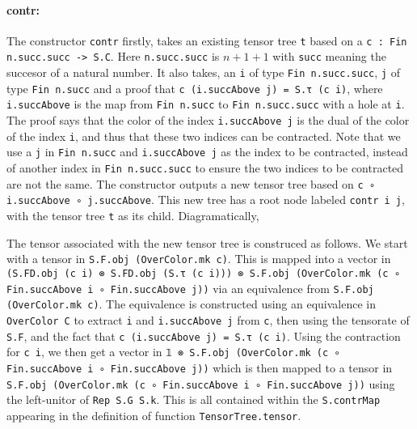 \documentclass[a4paper, 11pt]{article}
\newcommand{\tensorTree}[1]{
\begin{center}
  \fcolorbox{mycolor}{white}{%
#1}
\end{center}
}
\begin{document}
\paragraph{contr:}
The constructor \lstinline|contr| firstly, takes an existing tensor tree \lstinline|t| based on a 
\lstinline|c : Fin n.succ.succ -> S.C|. Here \lstinline|n.succ.succ| is $n + 1 + 1$ with \lstinline|succ| meaning 
the succesor of a natural number. 
It also takes,
an \lstinline|i| of type \lstinline|Fin n.succ.succ|, \lstinline|j| of type \lstinline|Fin n.succ|
and a proof that \lstinline|c (i.succAbove j) = S.τ (c i)|, where \lstinline|i.succAbove| is the map from \lstinline|Fin n.succ| to \lstinline|Fin n.succ.succ| with a hole at \lstinline|i|. 
The proof says that the color of the index \lstinline|i.succAbove j| is the dual of the color of the index \lstinline|i|, and thus that these 
two indices can be contracted.
Note that we use a \lstinline|j| in \lstinline|Fin n.succ| and \lstinline|i.succAbove j| as the index to be contracted, instead 
of another index in  \lstinline|Fin n.succ.succ| to ensure the two indices to be contracted are not the same. 
The constructor outputs a new tensor tree based on \lstinline|c ∘ i.succAbove ∘ j.succAbove|. 
This new tree has a root node labeled \lstinline|contr i j|, with the tensor tree \lstinline|t| as its child.
Diagramatically, 
\tensorTree{
  \begin{tikzpicture}
    \node[draw=black] (A) at (0,0) {\lstinline|contr i j|};
    \node (B) at (0,-1) {\lstinline|t|};
    \draw[->] (A) -- (B);
  \end{tikzpicture} 
}
The tensor associated with the new tensor tree is construced as follows. 
We start with a tensor in \lstinline|S.F.obj (OverColor.mk c)|.
This is mapped into a vector in \lstinline|(S.FD.obj (c i) ⊗ S.FD.obj (S.τ (c i))) ⊗ S.F.obj (OverColor.mk (c ∘ Fin.succAbove i ∘ Fin.succAbove j))| via an equivalence from 
\lstinline|S.F.obj (OverColor.mk c)|. The equivalence is constructed using an equivalence 
in \lstinline|OverColor C| to extract \lstinline|i| and \lstinline|i.succAbove j| from \lstinline|c|,
then using the tensorate of \lstinline|S.F|, and the fact that \lstinline|c (i.succAbove j) = S.τ (c i)|. 
Using the contraction for \lstinline|c i|, we then get a vector in 
\lstinline|𝟙 ⊗ S.F.obj (OverColor.mk (c ∘ Fin.succAbove i ∘ Fin.succAbove j))| which is then 
mapped to a tensor in \lstinline|S.F.obj (OverColor.mk (c ∘ Fin.succAbove i ∘ Fin.succAbove j))| 
using the left-unitor of \lstinline|Rep S.G S.k|.
This is all contained within the \lstinline|S.contrMap| appearing in the definition of
function \lstinline|TensorTree.tensor|.
\end{document}
